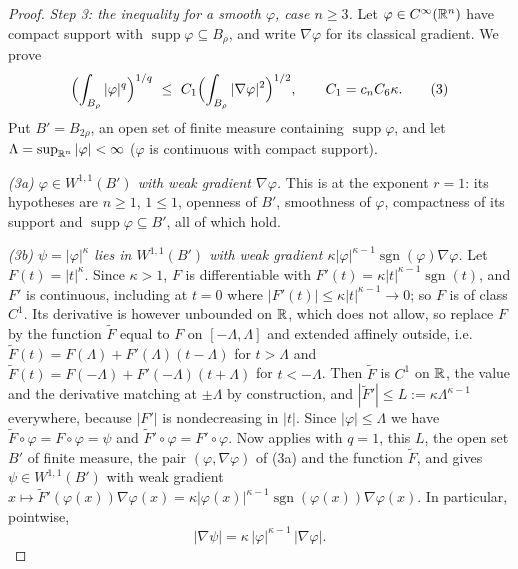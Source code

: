 \begin{proof}
\emph{Step 3: the inequality for a smooth $\varphi$, case $n\ge3$.}  Let
$\varphi\in C^\infty(\mathbb{R}^n)$ have compact support with
$\operatorname{supp}\varphi\subseteq B_\rho$, and write $\nabla\varphi$ for its
classical gradient.  We prove
\[
\Bigl(\int_{B_\rho}|\varphi|^{q}\Bigr)^{1/q}
\ \le\ C_1\Bigl(\int_{B_\rho}|\nabla\varphi|^2\Bigr)^{1/2},
\qquad C_1=c_nC_6\kappa .
\tag{3}
\]
Put $B'=B_{2\rho}$, an open set of finite measure containing
$\operatorname{supp}\varphi$, and let $\Lambda=\sup_{\mathbb{R}^n}|\varphi|<\infty$
($\varphi$ is continuous with compact support).

\emph{(3a) $\varphi\in W^{1,1}(B')$ with weak gradient $\nabla\varphi$.}  This is
 at the exponent $r=1$: its hypotheses are
$n\ge1$, $1\le1$, openness of $B'$, smoothness of $\varphi$, compactness of its
support and $\operatorname{supp}\varphi\subseteq B'$, all of which hold.

\emph{(3b) $\psi=|\varphi|^{\kappa}$ lies in $W^{1,1}(B')$ with weak gradient
$\kappa|\varphi|^{\kappa-1}\operatorname{sgn}(\varphi)\nabla\varphi$.}  Let
$F(t)=|t|^{\kappa}$.  Since $\kappa>1$, $F$ is differentiable with
$F'(t)=\kappa|t|^{\kappa-1}\operatorname{sgn}(t)$, and $F'$ is continuous,
including at $t=0$ where $|F'(t)|\le\kappa|t|^{\kappa-1}\to0$; so $F$ is of
class $C^1$.  Its derivative is however unbounded on $\mathbb{R}$, which
 does not allow, so replace $F$ by the function
$\widetilde F$ equal to $F$ on $[-\Lambda,\Lambda]$ and extended affinely
outside, i.e.\ $\widetilde F(t)=F(\Lambda)+F'(\Lambda)(t-\Lambda)$ for
$t>\Lambda$ and $\widetilde F(t)=F(-\Lambda)+F'(-\Lambda)(t+\Lambda)$ for
$t<-\Lambda$.  Then $\widetilde F$ is $C^1$ on $\mathbb{R}$, the value and the
derivative matching at $\pm\Lambda$ by construction, and
$|\widetilde F'|\le L:=\kappa\Lambda^{\kappa-1}$ everywhere, because $|F'|$ is
nondecreasing in $|t|$.  Since $|\varphi|\le\Lambda$ we have
$\widetilde F\circ\varphi=F\circ\varphi=\psi$ and
$\widetilde F'\circ\varphi=F'\circ\varphi$.  Now
 applies with $q=1$, this $L$, the open set $B'$ of
finite measure, the pair $(\varphi,\nabla\varphi)$ of (3a) and the function
$\widetilde F$, and gives $\psi\in W^{1,1}(B')$ with weak gradient
$x\mapsto\widetilde F'(\varphi(x))\nabla\varphi(x)
=\kappa|\varphi(x)|^{\kappa-1}\operatorname{sgn}(\varphi(x))\nabla\varphi(x)$.
In particular, pointwise,
\[
|\nabla\psi|=\kappa\,|\varphi|^{\kappa-1}\,|\nabla\varphi| .
\tag{4}
\]


\end{proof}
